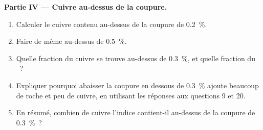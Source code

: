 \begin{problem}
\noindent\textbf{Partie IV --- Cuivre au-dessus de la coupure.}
\begin{enumerate}[resume]
  \item Calculer le cuivre contenu au-dessus de la coupure de \qty{0.2}{\percent}.
  \item Faire de même au-dessus de \qty{0.5}{\percent}.
  \item Quelle fraction du cuivre se trouve au-dessus de \qty{0.3}{\percent}, et quelle fraction du
        ~?
  \item Expliquer pourquoi abaisser la coupure en dessous de \qty{0.3}{\percent} ajoute beaucoup de roche et peu
        de cuivre, en utilisant les réponses aux questions 9 et 20.
  \item En résumé, combien de cuivre l'indice contient-il au-dessus de la coupure de \qty{0.3}{\percent}~?
\end{enumerate}
\end{problem}
